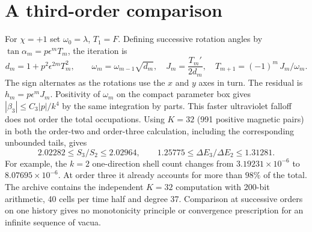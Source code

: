 \section{A third-order comparison}\label{app:B}
For $\chi=+1$ set $\omega_0=\lambda$, $T_1=F$. Defining successive rotation angles by $\tan\alpha_m=p\epsilon^m T_m$, the iteration is
\[
 d_m=1+p^2\epsilon^{2m}T_m^2,\qquad
 \omega_m=\omega_{m-1}\sqrt{d_m},\quad J_m=\frac{T_m'}{2d_m},\quad
 T_{m+1}=(-1)^m\,J_m/\omega_m .
\]
The sign alternates as the rotations use the $x$ and $y$ axes in turn. The residual is $h_m=p\epsilon^mJ_m$. Positivity of $\omega_m$ on the compact parameter box gives $|\beta_3|\le C_3|p|/k^4$ by the same integration by parts. This faster ultraviolet falloff does not order the total occupations. Using $K=32$ (991 positive magnetic pairs) in both the order-two and order-three calculation, including the corresponding unbounded tails, gives
\[
 2.02282\le S_3/S_2\le2.02964,\qquad
 1.25775\le\Delta E_3/\Delta E_2\le1.31281 .
\]
For example, the $k=2$ one-direction shell count changes from
$3.19231\times10^{-6}$ to $8.07695\times10^{-6}$. At order three it already accounts for more than $98\%$ of the total. The archive contains the independent $K=32$ computation with 200-bit arithmetic, 40 cells per time half and degree 37. Comparison at successive orders on one history gives no monotonicity principle or convergence prescription for an infinite sequence of vacua.
